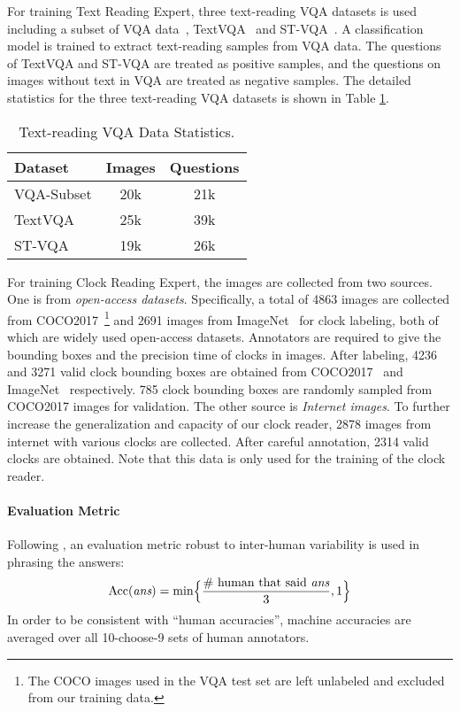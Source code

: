 For training Text Reading Expert, three text-reading VQA datasets is used including a subset of VQA data~\citep{antol2015vqa}, TextVQA~\citep{textvqa} and ST-VQA~\citep{stvqa}. A classification model is trained to extract text-reading samples from VQA data. The questions of TextVQA and ST-VQA are treated as positive samples, and the questions on images without text in VQA are treated as negative samples. The detailed statistics for the three text-reading VQA datasets is shown in Table \ref{tab:textvqa_stat}.

\begin{table}[ht]
\caption{\label{table:compare} Text-reading VQA Data Statistics.}
\centering
\begin{tabular}{l|c|c}
\toprule 
\textbf{Dataset} & \textbf{Images} & \textbf{Questions} \\
\midrule
VQA-Subset & 20k & 21k  \\
TextVQA & 25k & 39k  \\
ST-VQA & 19k & 26k  \\
\bottomrule
\end{tabular}
\label{tab:textvqa_stat}
\end{table}

For training Clock Reading Expert, the images are collected from two sources. One is from \textit{open-access datasets}. Specifically, a total of 4863 images are collected from COCO2017~\citep{lin2014microsoft}\footnote{The COCO images used in the VQA test set are left unlabeled and excluded from our training data.} and 2691 images from ImageNet~\citep{deng2009imagenet} for clock labeling, both of which are widely used open-access datasets. Annotators are required to give the bounding boxes and the precision time of clocks in images. After labeling, 4236 and 3271 valid clock bounding boxes are obtained from COCO2017~\citep{lin2014microsoft} and ImageNet~\citep{deng2009imagenet} respectively. 785 clock bounding boxes are randomly sampled from COCO2017 images for validation.
The other source is \textit{Internet images}. To further increase the generalization and capacity of our clock reader, 2878 images from internet with various clocks are collected. After careful annotation, 2314 valid clocks are obtained. Note that this data is only used for the training of the clock reader.

\paragraph{Evaluation Metric}
Following \citep{antol2015vqa}, an evaluation metric robust to inter-human variability is used in phrasing the answers: 
\begin{equation}\label{eq:evaluation}
\text{Acc({\it ans})} = \text{min} \Big\lbrace \frac{\text{\# human that said {\it ans}}}{3}, 1 \Big\rbrace
\end{equation}
In order to be consistent with ``human accuracies'', machine accuracies are averaged over all 10-choose-9 sets of human annotators.

